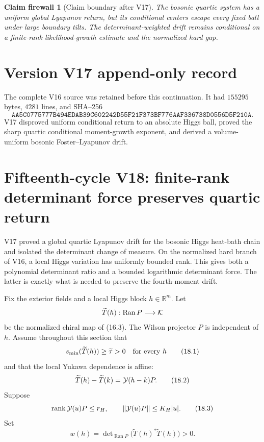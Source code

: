 \documentclass[11pt]{article}
\newtheorem{firewall}[theorem]{Claim firewall}
\theoremstyle{remark}
\begin{document}
\begin{firewall}[Claim boundary after V17]
\label{fire:v15v17}
The bosonic quartic system has a uniform global Lyapunov return, but
its conditional centers escape every fixed ball under large
boundary tilts.  The determinant-weighted drift remains conditional
on a finite-rank likelihood-growth estimate and the normalized hard
gap.
\end{firewall}

\section*{Version V17 append-only record}
The complete V16 source was retained before this continuation.  It
had \(155295\) bytes, \(4281\) lines, and SHA--256
\[
 \texttt{AA5C0775777B494EDAB39C602242D55F21F373BF776AAF336738D0556D5F210A}.
\]
V17 disproved uniform conditional return to an absolute Higgs ball,
proved the sharp quartic conditional moment-growth exponent, and
derived a volume-uniform bosonic Foster--Lyapunov drift.
\section{Fifteenth-cycle V18: finite-rank determinant force preserves quartic return}
\label{sec:v15v18}

V17 proved a global quartic Lyapunov drift for the bosonic Higgs
heat-bath chain and isolated the determinant change of measure.
On the normalized hard branch of V16, a local Higgs variation has
uniformly bounded rank.  This gives both a polynomial determinant
ratio and a bounded logarithmic determinant force.  The latter is
exactly what is needed to preserve the fourth-moment drift.

Fix the exterior fields and a local Higgs block
\(h\in\mathbb R^m\).  Let
\[
 \widetilde T(h):\operatorname{Ran}P\longrightarrow{\cal K}
\]
be the normalized chiral map of (16.3).  The Wilson projector \(P\)
is independent of \(h\).  Assume throughout this section that
\[
 s_{\min}(\widetilde T(h))\ge\widetilde\tau>0
 \quad\hbox{for every }h                                   \tag{18.1}
\]
and that the local Yukawa dependence is affine:
\[
 \widetilde T(h)-\widetilde T(k)
 ={\cal Y}(h-k)P.                                           \tag{18.2}
\]
Suppose
\[
 \operatorname{rank}{\cal Y}(u)P\le r_H,\qquad
 \|{\cal Y}(u)P\|\le K_H|u|.                                \tag{18.3}
\]
Set
\[
 w(h)=\det\nolimits_{\operatorname{Ran}P}
       \bigl(\widetilde T(h)^*\widetilde T(h)\bigr)>0.       \tag{18.4}
\]
\end{document}
